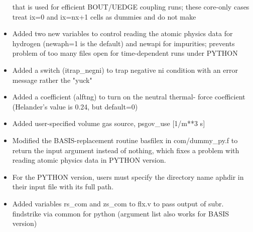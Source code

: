 \documentclass [12pt]{article}
\begin{document}
\begin{itemize}
	  that is used for efficient BOUT/UEDGE coupling runs; these 
	  core-only cases treat ix=0 and ix=nx+1 cells as dummies and 
	  do not make
   \item Added two new variables to control reading the atomic physics
	  data for hydrogen (newaph=1 is the default) and newapi for 
	  impurities; prevents problem of too many files open for
	  time-dependent runs under PYTHON
   \item Added a switch (itrap\_negni) to trap negative ni condition
	  with an error message rather the "yuck"
   \item Added a coefficient (alftng) to turn on the neutral thermal-
	  force coefficient (Helander's value is 0.24, but default=0) 
   \item Added user-specified volume gas source, psgov\_use [1/m**3 s] 
   \item Modified the BASIS-replacement routine basfilex in 
	  com/dummy\_py.f to return the input argument instead of 
	  nothing, which fixes a problem with reading atomic physics 
	  data in PYTHON version.
   \item For the PYTHON version, users must specify the directory name
	  aphdir in their input file with its full path.
   \item Added variables rs\_com and zs\_com to flx.v to pass output of
	  subr. findstrike via common for python (argument list also
	  works for BASIS version)
\end{itemize}
\end{document}
